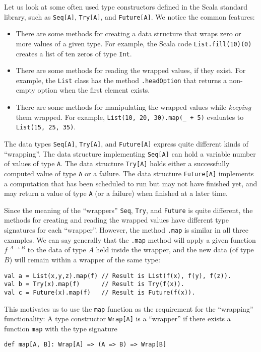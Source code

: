 Let us look at some often used type constructors defined in the Scala
standard library, such as \lstinline!Seq[A]!, \lstinline!Try[A]!,
and \lstinline!Future[A]!. We notice the common features:
\begin{itemize}
\item There are some methods for creating a data structure that wraps zero
or more values of a given type. For example, the Scala code \lstinline!List.fill(10)(0)!
creates a list of ten zeros of type \lstinline!Int!.
\item There are some methods for reading the wrapped values, if they exist.
For example, the \lstinline!List! class has the method \lstinline!.headOption!
that returns a non-empty option when the first element exists.
\item There are some methods for manipulating the wrapped values while \emph{keeping}
them wrapped. For example, \lstinline!List(10, 20, 30).map(_ + 5)!
evaluates to \lstinline!List(15, 25, 35)!.
\end{itemize}
The data types \lstinline!Seq[A]!, \lstinline!Try[A]!, and \lstinline!Future[A]!
express quite different kinds of ``wrapping''. The data structure
implementing \lstinline!Seq[A]! can hold a variable number of values
of type \lstinline!A!. The data structure \lstinline!Try[A]! holds
either a successfully computed value of type \lstinline!A! or a failure.
The data structure \lstinline!Future[A]! implements a computation
that has been scheduled to run but may not have finished yet, and
may return a value of type \lstinline!A! (or a failure) when finished
at a later time.

Since the meaning of the ``wrappers'' \lstinline!Seq!, \lstinline!Try!,
and \lstinline!Future! is quite different, the methods for creating
and reading the wrapped values have different type signatures for
each ``wrapper''. However, the method \lstinline!.map! is similar
in all three examples. We can say generally that the \lstinline!.map!
method will apply a given function $f^{:A\rightarrow B}$ to the data
of type $A$ held inside the wrapper, and the new data (of type $B$)
will remain within a wrapper of the same type:
\begin{lstlisting}
val a = List(x,y,z).map(f) // Result is List(f(x), f(y), f(z)).
val b = Try(x).map(f)      // Result is Try(f(x)).
val c = Future(x).map(f)   // Result is Future(f(x)).
\end{lstlisting}
This motivates us to use the \lstinline!map! function as the requirement
for the ``wrapping'' functionality: A type constructor \lstinline!Wrap[A]!
is a ``wrapper'' if there exists a function \lstinline!map! with
the  type signature
\begin{lstlisting}
def map[A, B]: Wrap[A] => (A => B) => Wrap[B]
\end{lstlisting}


